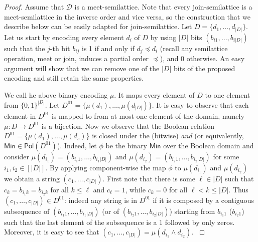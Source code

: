 \documentclass[11pt]{article}
\newcommand{\Pol}{\textsf{Pol}}
\newcommand{\Min}{\textsf{Min}}
\newcommand{\1}{\textbf{1}}
\begin{document}
\begin{proof}
    Assume that $\mathcal{D}$ is a meet-semilattice. Note that every join-semilattice is a meet-semilattice in the inverse order and vice versa, so the construction that we describe below can be easily adapted for join-semilattice. Let $D=\{d_1,\ldots,d_{|D|}\}$. Let us start by encoding every element $d_i$ of $D$ by using $|D|$ bits $(b_{i1},\ldots,b_{i{|D|}})$ such that the $j$-th bit $b_{ij}$ is 1 if and only if $d_{j}\preceq d_i$ (recall any semilattice operation, meet or join, induces a partial order $\preceq$), and $0$ otherwise. An easy argument will show that we can remove one of the $|D|$ bits of the proposed encoding and still retain the same properties.  
    
    
    {We call he above binary encoding $\mu$. It maps every element of $D$ to one element from $\{0,1\}^{|D|}$. Let $D^{01}=\{\mu(d_1),\ldots,\mu(d_{|D|})\}$. It is easy to observe that each element in $D^{01}$ is mapped to from at most one element of the domain, namely $\mu:D\rightarrow D^{01}$ is a bijection. Now we observe that the Boolean relation $D^{01} = \{\mu(d_1), \dots, \mu(d_s)\}$ is closed under the (bitwise) \textit{and} (or equivalently, $\Min \in \Pol(D^{01})$). Indeed, let $\phi$ be the binary $\Min$ over the Boolean domain and consider $\mu(d_{i_1}) = (b_{i_1 1}, \dots, b_{i_1 |D|})$ and $\mu(d_{i_2}) = (b_{i_2 1}, \dots, b_{i_2 |D|})$ for some $i_1, i_2 \in [|D|]$. By applying component-wise the map $\phi$ to $\mu(d_{i_1})$ and $\mu(d_{i_2})$ we obtain a string $(c_1, \dots, c_{|D|})$. First note that there is some $\ell \in {|D|}$ such that $c_k = b_{i_1 k} = b_{i_2 k}$ for all $k \leq \ell$ and $c_{\ell} = 1$, while $c_k = 0$ for all $\ell < k \leq |D|$. Thus $(c_1, \dots, c_{|D|}) \in D^{01}$: indeed any string is in $D^{01}$ if it is composed by a contiguous subsequence of $(b_{i_1 1}, \dots, b_{i_1 |D|})$ (or of $(b_{i_2 1}, \dots, b_{i_2 |D|})$) starting from $b_{i_1 1}$ ($b_{i_2 1}$) such that the last element of the subsequence is a 1 followed by only zeros. Moreover, it is easy to see that $(c_1, \dots, c_{|D|}) = \mu(d_{i_1} \wedge d_{i_2})$.
    }


\end{proof}
\end{document}
